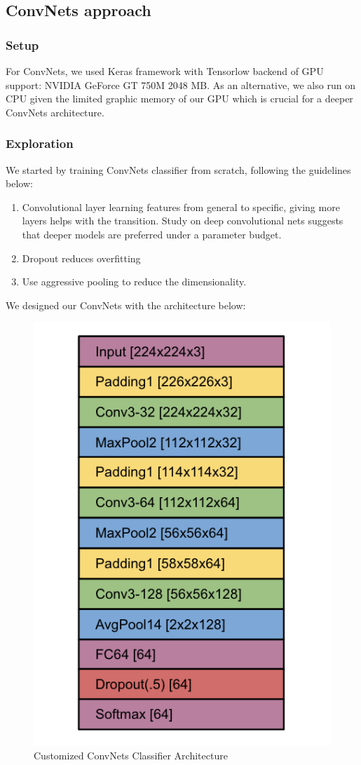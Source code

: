 \documentclass[journal, 10pt]{IEEEtran}
\begin{document}
\subsection{ConvNets approach}
  \subsubsection{Setup}
  For ConvNets, we used Keras framework \cite{Keras} with Tensorlow backend of GPU support: NVIDIA GeForce GT 750M 2048 MB. As an alternative, we also run on CPU given the limited graphic memory of our GPU which is crucial for a deeper ConvNets architecture.

  \subsubsection{Exploration}
  We started by training ConvNets classifier from scratch, following the guidelines below:
  \begin{enumerate}
    \item Convolutional layer learning features from general to specific, giving more layers helps with the transition. Study on deep convolutional nets suggests that deeper models are preferred under a parameter budget\cite{Deep2013}.
    \item Dropout reduces overfitting \cite{Dropout} \cite{Alex2014}
    \item Use aggressive pooling to reduce the dimensionality.
  \end{enumerate}
  We designed our ConvNets with the architecture below:
  \begin{figure}[H]
    \center
    \includegraphics[scale=0.4]{cnn_arch}
    \caption{Customized ConvNets Classifier Architecture}
    \label{cnn_arch}
  \end{figure}
\end{document}
